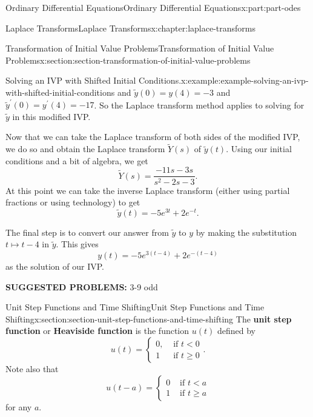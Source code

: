 \documentclass[twoside,10pt,]{book}
\newcommand{\terminology}[1]{\textbf{#1}}
\numberwithin{equation}{part}
\newcommand{\lt}{<}
\newcommand{\amp}{&}
\begin{document}
\begin{partptx}{Ordinary Differential Equations}{}{Ordinary Differential Equations}{}{}{x:part:part-odes}
\begin{chapterptx}{Laplace Transforms}{}{Laplace Transforms}{}{}{x:chapter:laplace-transforms}
\begin{sectionptx}{Transformation of Initial Value Problems}{}{Transformation of Initial Value Problems}{}{}{x:section:section-transformation-of-initial-value-problems}
\begin{example}{Solving an IVP with Shifted Initial Conditions.}{x:example:example-solving-an-ivp-with-shifted-initial-conditions}
and \(\widetilde{y}(0) = y(4) = -3\) and \(\widetilde{y}^\prime(0) = y^\prime(4) = -17\). So the Laplace transform method applies to solving for \(\widetilde{y}\) in this modified IVP.%
\par
Now that we can take the Laplace transform of both sides of the modified IVP, we do so and obtain the Laplace transform \(\widetilde{Y}(s)\) of \(\widetilde{y}(t)\). Using our initial conditions and a bit of algebra, we get%
\begin{equation*}
\widetilde{Y}(s) = \frac{-11s-3s}{s^2-2s-3}.
\end{equation*}
At this point we can take the inverse Laplace transform (either using partial fractions or using technology) to get%
\begin{equation*}
\widetilde{y}(t) = -5e^{3t} + 2e^{-t}.
\end{equation*}
%
\par
The final step is to convert our answer from \(\widetilde{y}\) to \(y\) by making the substitution \(t\mapsto t-4\) in \(\widetilde{y}\). This gives%
\begin{equation*}
y(t) = -5e^{3(t-4)} + 2e^{-(t-4)}
\end{equation*}
as the solution of our IVP.%
\end{example}
\terminology{SUGGESTED PROBLEMS:} 3-9 odd\end{sectionptx}
%
%
\typeout{************************************************}
\typeout{************************************************}
%
\begin{sectionptx}{Unit Step Functions and Time Shifting}{}{Unit Step Functions and Time Shifting}{}{}{x:section:section-unit-step-functions-and-time-shifting}
The \terminology{unit step function} or \terminology{Heaviside function} is the function \(u(t)\) defined by%
\begin{equation*}
u(t) = \begin{cases}
0, \amp\text{ if }t\lt 0\\
1 \amp\text{ if } t\geq0
\end{cases}.
\end{equation*}
Note also that%
\begin{equation*}
u(t-a) = \begin{cases}
0 \amp\text{ if }t\lt a\\
1 \amp\text{ if } t\geq a
\end{cases}
\end{equation*}
for any \(a\).%
\par

\end{sectionptx}
\end{chapterptx}
\end{partptx}
\end{document}
